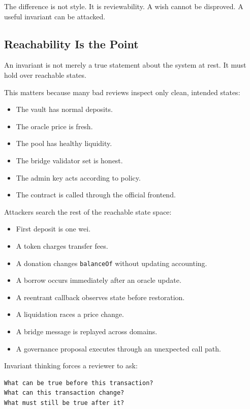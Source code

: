 The difference is not style. It is reviewability. A wish cannot be
disproved. A useful invariant can be attacked.

\subsection{Reachability Is the Point}

An invariant is not merely a true statement about the system at rest. It
must hold over reachable states.

This matters because many bad reviews inspect only clean, intended
states:

\begin{itemize}
\tightlist
\item
  The vault has normal deposits.
\item
  The oracle price is fresh.
\item
  The pool has healthy liquidity.
\item
  The bridge validator set is honest.
\item
  The admin key acts according to policy.
\item
  The contract is called through the official frontend.
\end{itemize}

Attackers search the rest of the reachable state space:

\begin{itemize}
\tightlist
\item
  First deposit is one wei.
\item
  A token charges transfer fees.
\item
  A donation changes \passthrough{\lstinline!balanceOf!} without
  updating accounting.
\item
  A borrow occurs immediately after an oracle update.
\item
  A reentrant callback observes state before restoration.
\item
  A liquidation races a price change.
\item
  A bridge message is replayed across domains.
\item
  A governance proposal executes through an unexpected call path.
\end{itemize}

Invariant thinking forces a reviewer to ask:

\begin{lstlisting}
What can be true before this transaction?
What can this transaction change?
What must still be true after it?
\end{lstlisting}

